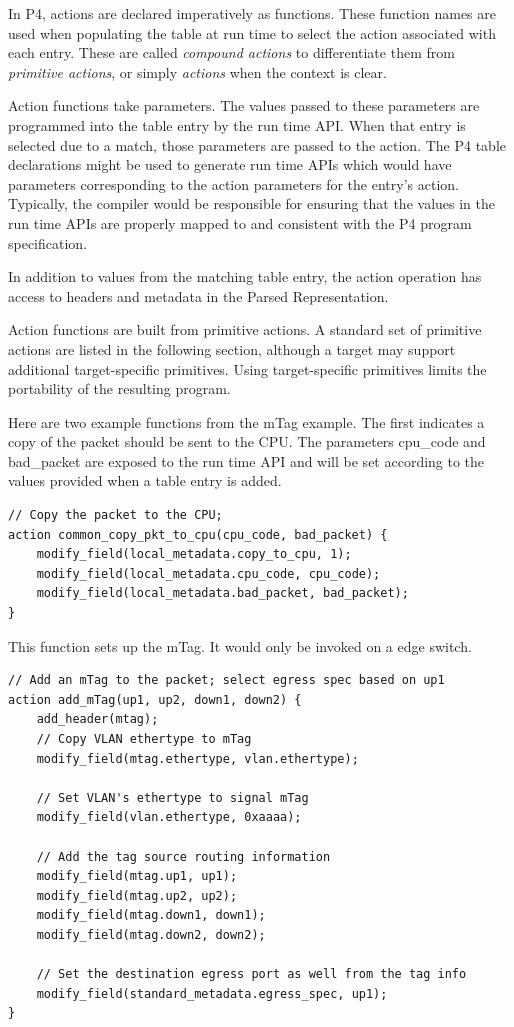 \documentclass[12pt]{article}
\begin{document}

In P4, actions are declared imperatively as functions. These function
names are used when populating the table at run time to select the
action associated with each entry. These are called \textit{compound
actions} to differentiate them from \textit{primitive actions}, or
simply \textit{actions} when the context is clear.

Action functions take parameters. The values passed to these
parameters are programmed into the table entry by the run time
API. When that entry is selected due to a match, those parameters are
passed to the action. The P4 table declarations might be used to
generate run time APIs which would have parameters corresponding to
the action parameters for the entry's action.  Typically, the compiler
would be responsible for ensuring that the values in the run time APIs
are properly mapped to and consistent with the P4 program
specification.

In addition to values from the matching table entry, the action operation
has access to headers and metadata in the Parsed Representation.

Action functions are built from primitive actions. A standard set of
primitive actions are listed in the following section, although a
target may support additional target-specific primitives. Using
target-specific primitives limits the portability of the resulting
program.

Here are two example functions from the mTag example.  The first indicates
a copy of the packet should be sent to the CPU.  The parameters cpu_code
and bad_packet are exposed to the run time API and will be set according
to the values provided when a table entry is added.

\begin{lstlisting}[keywords={},frame=single,escapechar=\@]
// Copy the packet to the CPU;
action common_copy_pkt_to_cpu(cpu_code, bad_packet) {
    modify_field(local_metadata.copy_to_cpu, 1);
    modify_field(local_metadata.cpu_code, cpu_code);
    modify_field(local_metadata.bad_packet, bad_packet);
}
\end{lstlisting}


This function sets up the mTag. It would only be invoked on a edge switch.

\begin{lstlisting}[keywords={},frame=single,escapechar=\@]
// Add an mTag to the packet; select egress spec based on up1
action add_mTag(up1, up2, down1, down2) {
    add_header(mtag);
    // Copy VLAN ethertype to mTag
    modify_field(mtag.ethertype, vlan.ethertype);

    // Set VLAN's ethertype to signal mTag
    modify_field(vlan.ethertype, 0xaaaa);

    // Add the tag source routing information
    modify_field(mtag.up1, up1);
    modify_field(mtag.up2, up2);
    modify_field(mtag.down1, down1);
    modify_field(mtag.down2, down2);

    // Set the destination egress port as well from the tag info
    modify_field(standard_metadata.egress_spec, up1);
}
\end{lstlisting}
\end{document}
